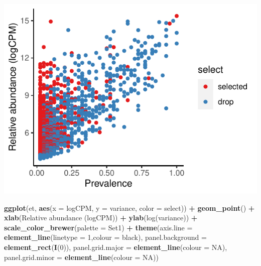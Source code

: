 \documentclass[
]{article}
\newenvironment{Shaded}{\begin{snugshade}}{\end{snugshade}}
\newcommand{\AttributeTok}[1]{\textcolor[rgb]{0.13,0.29,0.53}{#1}}
\newcommand{\ConstantTok}[1]{\textcolor[rgb]{0.56,0.35,0.01}{#1}}
\newcommand{\DecValTok}[1]{\textcolor[rgb]{0.00,0.00,0.81}{#1}}
\newcommand{\FunctionTok}[1]{\textcolor[rgb]{0.13,0.29,0.53}{\textbf{#1}}}
\newcommand{\NormalTok}[1]{#1}
\newcommand{\SpecialCharTok}[1]{\textcolor[rgb]{0.81,0.36,0.00}{\textbf{#1}}}
\newcommand{\StringTok}[1]{\textcolor[rgb]{0.31,0.60,0.02}{#1}}
\begin{document}
\includegraphics{workshop_files/figure-latex/unnamed-chunk-51-4.pdf}

\begin{Shaded}
\begin{Highlighting}[]

\FunctionTok{ggplot}\NormalTok{(et, }\FunctionTok{aes}\NormalTok{(}\AttributeTok{x =}\NormalTok{ logCPM, }\AttributeTok{y =}\NormalTok{ variance, }\AttributeTok{color =}\NormalTok{ select)) }\SpecialCharTok{+} \FunctionTok{geom\_point}\NormalTok{() }\SpecialCharTok{+}
  \FunctionTok{xlab}\NormalTok{(}\StringTok{\textquotesingle{}Relative abundance (logCPM)\textquotesingle{}}\NormalTok{) }\SpecialCharTok{+} \FunctionTok{ylab}\NormalTok{(}\StringTok{\textquotesingle{}log(variance)\textquotesingle{}}\NormalTok{) }\SpecialCharTok{+} 
  \FunctionTok{scale\_color\_brewer}\NormalTok{(}\AttributeTok{palette =} \StringTok{\textquotesingle{}Set1\textquotesingle{}}\NormalTok{) }\SpecialCharTok{+}
  \FunctionTok{theme}\NormalTok{(}\AttributeTok{axis.line =} \FunctionTok{element\_line}\NormalTok{(}\AttributeTok{linetype =} \DecValTok{1}\NormalTok{,}\AttributeTok{colour =} \StringTok{\textquotesingle{}black\textquotesingle{}}\NormalTok{),}
        \AttributeTok{panel.background =} \FunctionTok{element\_rect}\NormalTok{(}\FunctionTok{I}\NormalTok{(}\DecValTok{0}\NormalTok{)),}
        \AttributeTok{panel.grid.major =} \FunctionTok{element\_line}\NormalTok{(}\AttributeTok{colour =} \ConstantTok{NA}\NormalTok{),}
        \AttributeTok{panel.grid.minor =} \FunctionTok{element\_line}\NormalTok{(}\AttributeTok{colour =} \ConstantTok{NA}\NormalTok{))}
\end{Highlighting}
\end{Shaded}
\end{document}

